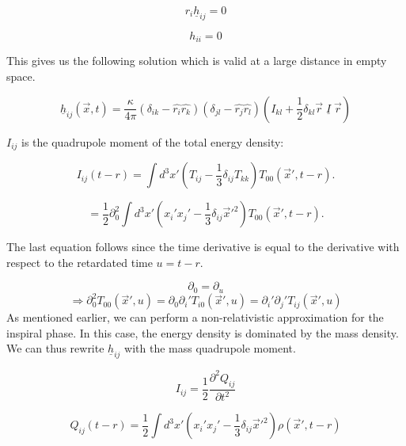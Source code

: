 \begin{equation}
    r_i \underline{h}_{ij} = 0
\end{equation}

\begin{equation}
    h_{ii} = 0
\end{equation}

This gives us the following solution which is valid at a large distance in empty space.

\begin{equation}
    \underline{h}_{ij}(\vec{x}, t)=\frac{\kappa}{4\pi}(\delta_{ik}-\hat{r_i}\hat{r_k})(\delta_{jl}-\hat{r_j}\hat{r_l})\left(I_{kl}+\frac{1}{2}\delta_{kl}\vec{r}\; \underline{I} \; \vec{r}\right)
\end{equation}

$I_{ij}$ is the quadrupole moment of the total energy density:

\begin{equation}
    I_{ij}(t-r)= \int d^3x' \left(T_{ij} -\frac{1}{3}\delta_{ij}T_{kk} \right)T_{00}(\vec{x}', t-r) .
\end{equation}

\begin{equation}
    = \frac{1}{2} \partial_0^2 \int d^3x' \left(x_i' x_j' -\frac{1}{3}\delta_{ij}\vec{x}'^2 \right)T_{00}(\vec{x}', t-r) .
\end{equation}

The last equation follows since the time derivative is equal to the derivative with respect to the retardated time $u=t-r$.

\begin{equation}
    \partial_0 = \partial_u
\end{equation}
\begin{equation}
    \Rightarrow \partial_0^2T_{00}(\vec{x}', u) = \partial_0 \partial_i' T_{i0}(\vec{x}', u) = \partial_i'\partial_j' T_{ij}(\vec{x}', u)
\end{equation}
As mentioned earlier, we can perform a non-relativistic approximation for the inspiral phase. In this case, the energy density is dominated by the mass density. We can thus rewrite $\underline{h}_{ij}$ with the mass quadrupole moment. 


\begin{equation}
    I_{ij}=\frac{1}{2}\frac{\partial^2 Q_{ij}}{{\partial t^2}}
\end{equation}

\begin{equation}
    Q_{ij}(t-r)=\frac{1}{2} \int d^3x' \left(x_i' x_j' -\frac{1}{3}\delta_{ij}\vec{x}'^2 \right)\rho(\vec{x}', t-r)
\end{equation}

